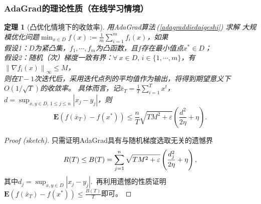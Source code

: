 \documentclass[9pt,aspectratio=169]{beamer}
\newtheorem{thm}{定理}
\newcommand{\any}{\forall \ }
\begin{document}
\begin{frame}
	\frametitle{AdaGrad的理论性质（在线学习情境）}
\begin{thm}[凸优化情境下的收敛率]
	用AdaGrad算法\,(\ref{adagraddiedaigeshi})\,\,求解
	大规模优化问题$\min_{x\in D} f(x):=\frac{1}{m}\sum_{i=1}^{m}f_i(x)$，如果
	\\ \vspace{0.2cm} 假设1：$D$为紧凸集，$f_1,\cdots,f_m$为凸函数，且$f$存在最小值点$x^{*}\in D$；
	\\ \vspace{0.1cm} 假设2：随机（次）梯度一致有界：$\any x\in D,\,i\in \{1,\cdots,m\}$，有$\left\| \nabla f_i(x) \right\|_\infty \leq M $，
	\\ \vspace{0.1cm} 
	则在$T-1$次迭代后，采用迭代点列的平均值作为输出，将得到期望意义下$O(1/\sqrt{T})$的收敛率。
	具体而言，记$\bar{x}_T=\frac{1}{T}\sum_{i=1}^{T}x^t$，$d=\sup_{x,y\in D,\,1\leq j\leq n} \left| x_j-y_j \right| $，则
	\vspace{-0.2cm}\begin{equation}
		\mathbf{E}\left(f(\bar{x}_T)-f(x^{*})\right)\leq \frac{n}{T} \sqrt{TM^2+\varepsilon} \left( \frac{d^2}{2\eta}+\eta \right).
\end{equation}
\end{thm}
\begin{proof}[Proof (sketch)]
	只需证明AdaGrad具有与随机梯度选取无关的遗憾界
    \vspace{-0.2cm}\begin{equation}
        R(T)\leq B(T)=\sum_{j=1}^{n} \sqrt{TM^2+\varepsilon} \left( \frac{d_j^2}{2\eta}+\eta  \right),
   \vspace{-0.2cm} \end{equation}
    其中$d_j=\sup_{x,y\in D}\left| x_j-y_j \right|$.\ 再利用遗憾的性质证明$\mathbf{E}(f(\bar{x}_T)-f(x^{*}))\leq \frac{B(T)}{T}$即可。
\end{proof}
\end{frame}
\end{document}
